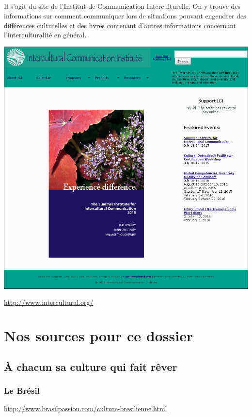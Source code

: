 \paragraph{} Il s'agit du site de l'Institut de Communication Interculturelle.
On y trouve des informations sur comment communiquer lors de situations
pouvant engendrer des différences culturelles et des livres contenant d'autres
informations concernant l'interculturalité en général.

\begin{center}
	\includegraphics[scale=0.25]{Intercultural.png}
\end{center}
\url{http://www.intercultural.org/}

\chapter[Sources]{Nos sources pour ce dossier}

\section{À chacun sa culture qui fait rêver}

\subsection{Le Brésil}
\noindent
\url{http://www.brasilpassion.com/culture-bresilienne.html}

